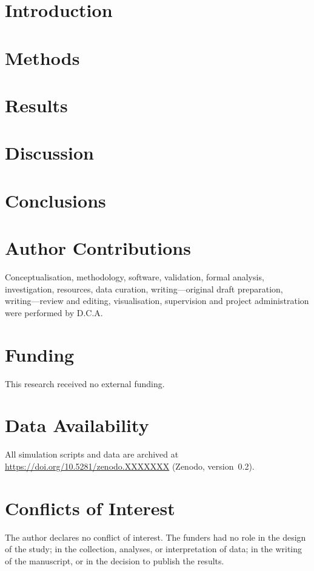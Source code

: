 \documentclass[
  entropy,             %
  article,             %
  accept,              %
  pdftex,              %
  moreauthors          %
]{mdpi}
\begin{document}
\section{Introduction}\label{sec:intro}


\section{Methods}\label{sec:methods}


\section{Results}\label{sec:results}


\section{Discussion}\label{sec:discussion}


\section{Conclusions}\label{sec:conclusion}


\section*{Author Contributions}
Conceptualisation, methodology, software, validation, formal analysis,
investigation, resources, data curation, writing—original draft
preparation, writing—review and editing, visualisation, supervision and
project administration were performed by D.C.A.

\section*{Funding}
This research received no external funding.

\section*{Data Availability}
All simulation scripts and data are archived at
\url{https://doi.org/10.5281/zenodo.XXXXXXX} (Zenodo, version 0.2).

\section*{Conflicts of Interest}
The author declares no conflict of interest. The funders had no role in
the design of the study; in the collection, analyses, or interpretation
of data; in the writing of the manuscript, or in the decision to publish
the results.



\end{document}
